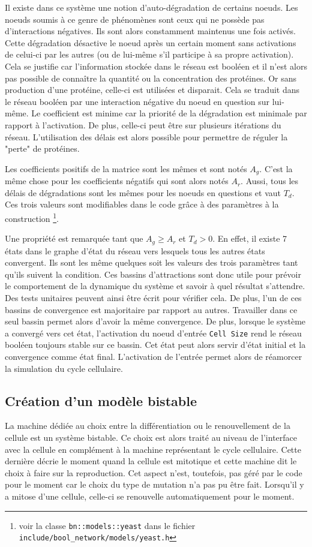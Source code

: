\documentclass[11pt, a4paper]{article}
\begin{document}
Il existe dans ce système une notion d'auto-dégradation de certains noeuds. Les
noeuds soumis à ce genre de phénomènes sont ceux qui ne possède pas
d'interactions négatives. Ils sont alors constamment maintenus une fois
activés. Cette dégradation désactive le noeud après un certain moment sans
activations de celui-ci par les autres (ou de lui-même s'il participe à sa
propre activation). Cela se justifie car l'information stockée dans le réseau
est booléen et il n'est alors pas possible de connaître la quantité ou la
concentration des protéines. Or sans production d'une protéine, celle-ci est
utilisées et disparait. Cela se traduit dans le réseau booléen par une
interaction négative du noeud en question sur lui-même. Le coefficient est
minime car la priorité de la dégradation est minimale par rapport à
l'activation. De plus, celle-ci peut être sur plusieurs itérations du réseau.
L'utilisation des délais est alors possible pour permettre de réguler la
"perte" de protéines.

Les coefficients positifs de la matrice sont les mêmes et sont notés $A_g$.
C'est la même chose pour les coefficients négatifs qui sont alors notés $A_r$.
Aussi, tous les délais de dégradations sont les mêmes  pour les noeuds en
questions et vaut $T_d$. Ces trois valeurs sont modifiables dans le code grâce
à des paramètres à la construction \footnote{voir la classe
    \texttt{bn::models::yeast} dans le fichier
\texttt{include/bool\_network/models/yeast.h}}.

Une propriété est remarquée tant que $A_g \ge A_r$ et $T_d > 0$. En effet, il
existe 7 états dans le graphe d'état du réseau vers lesquels tous les autres
états convergent. Ils sont les même quelques soit les valeurs des trois
paramètres tant qu'ils suivent la condition. Ces bassins d'attractions sont
donc utile pour prévoir le comportement de la dynamique du système et savoir à
quel résultat s'attendre. Des tests unitaires peuvent ainsi être écrit pour
vérifier cela. De plus, l'un de ces bassins de convergence est majoritaire par
rapport au autres. Travailler dans ce seul bassin permet alors d'avoir la même
convergence. De plus, lorsque le système a convergé vers cet état, l'activation
du noeud d'entrée \texttt{Cell Size} rend le réseau booléen toujours stable sur
ce bassin. Cet état peut alors servir d'état initial et la convergence comme
état final. L'activation de l'entrée permet alors de réamorcer la simulation du
cycle cellulaire.

\subsection{Création d'un modèle bistable}
La machine dédiée au choix entre la différentiation ou le renouvellement de la
cellule est un système bistable. Ce choix est alors traité au niveau de
l'interface avec la cellule en complément à la machine représentant le cycle
cellulaire. Cette dernière décrie le moment quand la cellule est mitotique et
cette machine dit le choix à faire sur la reproduction. Cet aspect n'est,
toutefois, pas géré par le code pour le moment car le choix du type de mutation
n'a pas pu être fait. Lorsqu'il y a mitose d'une cellule, celle-ci se
renouvelle automatiquement pour le moment.
\end{document}
